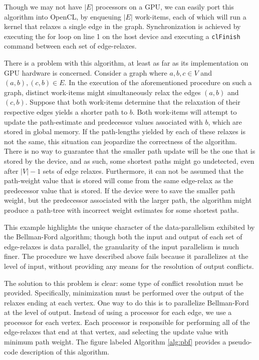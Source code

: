 \documentclass[12pt,twoside]{reedthesis}
\newcommand{\var}[1]{{\mbox{\tt#1}}}
\begin{document}
Though we may not have $|E|$ processors on a GPU, we can easily port this algorithm into OpenCL, by enqueuing $|E|$ work-items, each of which will run a kernel that relaxes a single edge in the graph. Synchronization is achieved by executing the for loop on line 1 on the host device and executing a \var{clFinish} command between each set of edge-relaxes.

There is a problem with this algorithm, at least as far as its implementation on GPU hardware is concerned. Consider a graph where $a,b,c \in V$ and $(a,b), (c,b) \in E$. In the execution of the aforementioned procedure on such a graph, distinct work-items might simultaneously relax the edges $(a,b)$ and $(c,b)$. Suppose that both work-items determine that the relaxation of their respective edges yields a shorter path to $b$. Both work-items will attempt to update the path-estimate and predecessor values associated with $b$, which are stored in global memory. If the path-lengths yielded by each of these relaxes is not the same, this situation can jeopardize the correctness of the algorithm. There is no way to guarantee that the smaller path update will be the one that is stored by the device, and as such, some shortest paths might go undetected, even after $|V|-1$ sets of edge relaxes. Furthermore, it can not be assumed that the path-weight value that is stored will come from the same edge-relax as the predecessor value that is stored. If the device were to save the smaller path weight, but the predecessor associated with the larger path, the algorithm might produce a path-tree with incorrect weight estimates for some shortest paths.

This example highlights the unique character of the data-parallelism exhibited by the Bellman-Ford algorithm; though both the input and output of each set of edge-relaxes is data parallel, the granularity of the input parallelism is much finer.  The procedure we have described above fails because it parallelizes at the level of input, without providing any means for the resolution of output conflicts.

The solution to this problem is clear: some type of conflict resolution must be provided. Specifically, minimization must be performed over the output of the relaxes ending at each vertex.  One way to do this is to parallelize Bellman-Ford at the level of output. Instead of using a processor for each edge, we use a processor for each vertex. Each processor is responsible for performing all of the edge-relaxes that end at that vertex, and selecting the update value with minimum path weight. The figure labeled Algorithm \ref{alg:pbf} provides a pseudo-code description of this algorithm.
\end{document}
